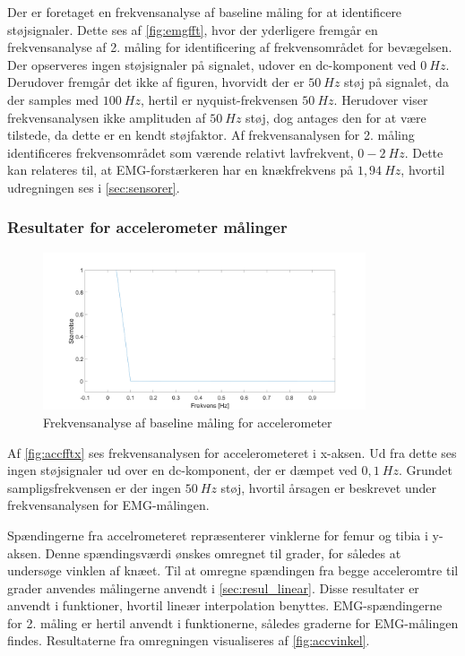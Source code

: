 Der er foretaget en frekvensanalyse af baseline måling for at identificere støjsignaler. Dette ses af \autoref{fig:emgfft}, hvor der yderligere fremgår en frekvensanalyse af 2. måling for identificering af frekvensområdet for bevægelsen. 
Der opserveres ingen støjsignaler på signalet, udover en dc-komponent ved $0~Hz$. Derudover fremgår det ikke af figuren, hvorvidt der er $50~Hz$ støj på signalet, da der samples med $100~Hz$, hertil er nyquist-frekvensen $50~Hz$. Herudover viser frekvensanalysen ikke amplituden af $50~Hz$ støj, dog antages den for at være tilstede, da dette er en kendt støjfaktor. Af frekvensanalysen for 2. måling identificeres frekvensområdet som værende relativt lavfrekvent, $0-2~Hz$. Dette kan relateres til, at EMG-forstærkeren har en knækfrekvens på $1,94~Hz$, hvortil udregningen ses i \autoref{sec:sensorer}. 


\subsubsection{Resultater for accelerometer målinger}

\begin{figure}[H]
	\centering
	\includegraphics[width=0.85\textwidth]{figures/Pilotforsoeg/accfft.png}
	\caption{Frekvensanalyse af baseline måling for accelerometer}
	\label{fig:accfftx}
\end{figure}
Af \autoref{fig:accfftx} ses frekvensanalysen for accelerometeret i x-aksen. Ud fra dette ses ingen støjsignaler ud over en dc-komponent, der er dæmpet ved $0,1~Hz$. Grundet sampligsfrekvensen er der ingen $50~Hz$ støj, hvortil årsagen er beskrevet under frekvensanalysen for EMG-målingen. 

Spændingerne fra accelrometeret repræsenterer vinklerne for femur og tibia i y-aksen. Denne spændingsværdi ønskes omregnet til grader, for således at undersøge vinklen af knæet. Til at omregne spændingen fra begge acceleromtre til grader anvendes målingerne anvendt i \autoref{sec:resul_linear}. Disse resultater er anvendt i funktioner, hvortil lineær interpolation benyttes. EMG-spændingerne for 2. måling er hertil anvendt i funktionerne, således graderne for EMG-målingen findes.
Resultaterne fra omregningen visualiseres af \autoref{fig:accvinkel}. 

